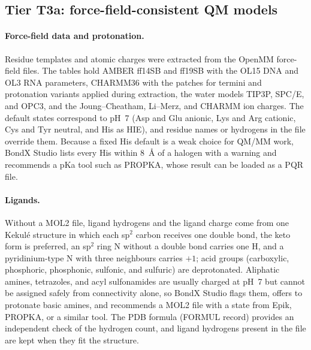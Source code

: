 \documentclass[journal=jcisd8,manuscript=article,layout=two-column]{achemso}
\newcommand{\BX}{BondX Studio}
\begin{document}
\subsection{Tier T3a: force-field-consistent QM models}
\paragraph{Force-field data and protonation.}
Residue templates and atomic charges were extracted from the OpenMM force-field files.\cite{Eastman2017} The tables hold AMBER ff14SB\cite{Maier2015} and ff19SB\cite{Tian2020} with the OL15 DNA\cite{GalindoMurillo2016} and OL3 RNA\cite{Zgarbova2011} parameters, CHARMM36\cite{Best2012} with the patches for termini and protonation variants applied during extraction, the water models TIP3P,\cite{Jorgensen1983} SPC/E,\cite{Berendsen1987} and OPC3,\cite{IzadiOnufriev2016} and the Joung--Cheatham,\cite{Joung2008} Li--Merz,\cite{LiMerz2015} and CHARMM ion charges. The default states correspond to pH~7 (Asp and Glu anionic, Lys and Arg cationic, Cys and Tyr neutral, and His as HIE), and residue names or hydrogens in the file override them. Because a fixed His default is a weak choice for QM/MM work, \BX{} lists every His within \SI{8}{\angstrom} of a halogen with a warning and recommends a pKa tool such as PROPKA, whose result can be loaded as a PQR file.\cite{Olsson2011}

\paragraph{Ligands.}
Without a MOL2 file, ligand hydrogens and the ligand charge come from one Kekul\'e structure in which each sp$^2$ carbon receives one double bond, the keto form is preferred, an sp$^2$ ring N without a double bond carries one H, and a pyridinium-type N with three neighbours carries $+1$; acid groups (carboxylic, phosphoric, phosphonic, sulfonic, and sulfuric) are deprotonated. Aliphatic amines, tetrazoles, and acyl sulfonamides are usually charged at pH~7 but cannot be assigned safely from connectivity alone, so \BX{} flags them, offers to protonate basic amines, and recommends a MOL2 file with a state from Epik, PROPKA, or a similar tool.\cite{Shelley2007,Olsson2011} The PDB formula (FORMUL record) provides an independent check of the hydrogen count, and ligand hydrogens present in the file are kept when they fit the structure.
\end{document}
